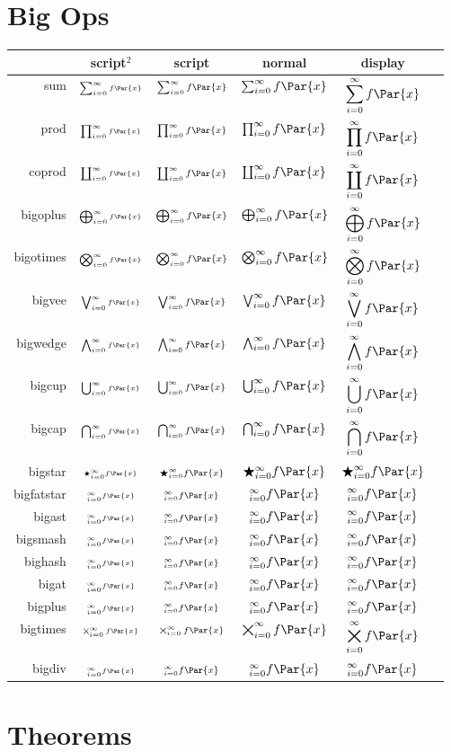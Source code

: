 \documentclass[11pt]{article}
\begin{document}
\section*{Big Ops}

\newcommand{\bigoptest}[1]{#1 & $\scriptscriptstyle{\call{#1}_{i=0}^\infty f\Par{x}}$ & $\scriptstyle{\call{#1}_{i=0}^\infty f\Par{x}}$ & $\call{#1}_{i=0}^\infty f\Par{x}$ & $\displaystyle{\call{#1}_{i=0}^\infty f\Par{x}}$\\}

\begin{center}
\begin{tabular}{r|ccccc}
    & script$^2$ & script & normal & display \\ \hline
    \bigoptest{sum}
    \bigoptest{prod}
    \bigoptest{coprod}
    \bigoptest{bigoplus}
    \bigoptest{bigotimes}
    \bigoptest{bigvee}
    \bigoptest{bigwedge}
    \bigoptest{bigcup}
    \bigoptest{bigcap}
    \bigoptest{bigstar}
    \bigoptest{bigfatstar}
    \bigoptest{bigast}
    \bigoptest{bigsmash}
    \bigoptest{bighash}
    \bigoptest{bigat}
    \bigoptest{bigplus}
    \bigoptest{bigtimes}
    \bigoptest{bigdiv}
\end{tabular}
\end{center}

\section*{Theorems}

\newcommand{\testthm}[3][]{
    \subsection{#2}
    \begin{S#3}[#1]
        For a magnetic field $\vB$, $\Dive\vB = 0$.
    \end{S#3}
    \begin{#3}
        The wavefunction $\Ps$ of a system is given by
        \[ i\hbar\pd{\Ps}{t} = \HH\Ps. \]
    \end{#3}
    \begin{#3*}
        \[ 1 + 2 + 3 + \cdots = -\frac{1}{12}. \]
    \end{#3*}
}
\newcommand{\testprf}[1]{
    \begin{#1}
        Let $V\subS U$.
    
        \FirstWay Let $V$ be open in $X$. Then, $U\cap V = V$ is open, and so
        $V$ is open in $U$.
        
        \OtherWay Let $V$ be open in $U$. Then, $V = U\cap W$ for some open
        $W$ in $X$. Because $U$ is open in $X$, $U\cap W$ is open. Hence $V$ is
        open in $X$.
    \end{#1}
}
\end{document}
